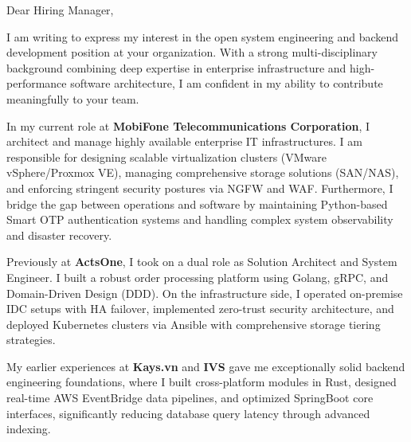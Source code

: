\documentclass[10pt, letterpaper]{article}
\begin{document}
\pagestyle{empty}



\vspace{0.5cm}

\begin{onecolentry}

Dear Hiring Manager,

\vspace{0.2cm}

I am writing to express my interest in the open system engineering and backend development position at your organization. With a strong multi-disciplinary background combining deep expertise in enterprise infrastructure and high-performance software architecture, I am confident in my ability to contribute meaningfully to your team.

\vspace{0.2cm}

In my current role at \textbf{MobiFone Telecommunications Corporation}, I architect and manage highly available enterprise IT infrastructures. I am responsible for designing scalable virtualization clusters (VMware vSphere/Proxmox VE), managing comprehensive storage solutions (SAN/NAS), and enforcing stringent security postures via NGFW and WAF. Furthermore, I bridge the gap between operations and software by maintaining Python-based Smart OTP authentication systems and handling complex system observability and disaster recovery.

\vspace{0.2cm}

Previously at \textbf{ActsOne}, I took on a dual role as Solution Architect and System Engineer. I built a robust order processing platform using Golang, gRPC, and Domain-Driven Design (DDD). On the infrastructure side, I operated on-premise IDC setups with HA failover, implemented zero-trust security architecture, and deployed Kubernetes clusters via Ansible with comprehensive storage tiering strategies.

\vspace{0.2cm}

My earlier experiences at \textbf{Kays.vn} and \textbf{IVS} gave me exceptionally solid backend engineering foundations, where I built cross-platform modules in Rust, designed real-time AWS EventBridge data pipelines, and optimized SpringBoot core interfaces, significantly reducing database query latency through advanced indexing.

\vspace{0.2cm}


\end{onecolentry}
\end{document}
